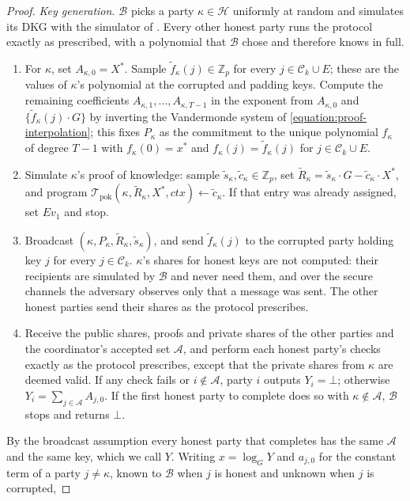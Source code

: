 \documentclass{article}
\theoremstyle{plain}
\theoremstyle{definition}
\theoremstyle{remark}
\begin{document}
\begin{proof}
  \emph{Key generation.}  $\mathcal{B}$ picks a party $\kappa \in \mathcal{H}$ uniformly at random and simulates its DKG with the simulator of \cite[Fig.~7]{cgrs23}.  Every other honest party runs the protocol exactly as prescribed, with a polynomial that $\mathcal{B}$ chose and therefore knows in full.
  \begin{enumerate}
    \item For $\kappa$, set $A_{\kappa,0} = X^*$.  Sample $\tilde{f}_\kappa(j) \in \mathbb{Z}_p$ for every $j \in \mathcal{C}_k \cup E$; these are the values of $\kappa$'s polynomial at the corrupted and padding keys.  Compute the remaining coefficients $A_{\kappa,1}, \ldots, A_{\kappa,T-1}$ in the exponent from $A_{\kappa,0}$ and $\{\tilde{f}_\kappa(j) \cdot G\}$ by inverting the Vandermonde system of \eqref{equation:proof-interpolation}; this fixes $P_\kappa$ as the commitment to the unique polynomial $f_\kappa$ of degree $T-1$ with $f_\kappa(0) = x^*$ and $f_\kappa(j) = \tilde{f}_\kappa(j)$ for $j \in \mathcal{C}_k \cup E$.
    \item Simulate $\kappa$'s proof of knowledge: sample $\tilde{s}_\kappa, \tilde{c}_\kappa \in \mathbb{Z}_p$, set $\tilde{R}_\kappa = \tilde{s}_\kappa \cdot G - \tilde{c}_\kappa \cdot X^*$, and program $\mathcal{T}_{\mathrm{pok}}(\kappa, \tilde{R}_\kappa, X^*, \mathit{ctx}) \leftarrow \tilde{c}_\kappa$.  If that entry was already assigned, set $\mathit{Ev}_1$ and stop.
    \item Broadcast $(\kappa, P_\kappa, \tilde{R}_\kappa, \tilde{s}_\kappa)$, and send $\tilde{f}_\kappa(j)$ to the corrupted party holding key $j$ for every $j \in \mathcal{C}_k$.  $\kappa$'s shares for honest keys are not computed: their recipients are simulated by $\mathcal{B}$ and never need them, and over the secure channels the adversary observes only that a message was sent.  The other honest parties send their shares as the protocol prescribes.
    \item Receive the public shares, proofs and private shares of the other parties and the coordinator's accepted set $\mathcal{A}$, and perform each honest party's checks exactly as the protocol prescribes, except that the private shares from $\kappa$ are deemed valid.  If any check fails or $i \notin \mathcal{A}$, party $i$ outputs $Y_i = \bot$; otherwise $Y_i = \sum_{j \in \mathcal{A}} A_{j,0}$.  If the first honest party to complete does so with $\kappa \notin \mathcal{A}$, $\mathcal{B}$ stops and returns $\bot$.
  \end{enumerate}
  By the broadcast assumption every honest party that completes has the same $\mathcal{A}$ and the same key, which we call $Y$.  Writing $x = \log_G Y$ and $a_{j,0}$ for the constant term of a party $j \ne \kappa$, known to $\mathcal{B}$ when $j$ is honest and unknown when $j$ is corrupted,

\end{proof}
\end{document}
